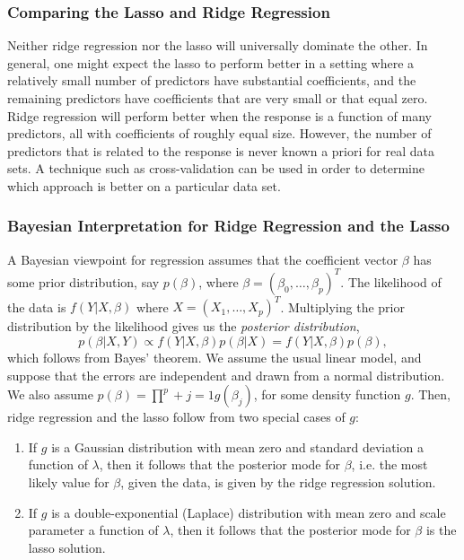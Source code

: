 \documentclass{article}
\numberwithin{equation}{section}
\begin{document}
\begin{enumerate}
\subsubsection*{Comparing the Lasso and Ridge Regression}
Neither ridge regression nor the lasso will universally dominate the other. In general, one might expect the lasso to perform better in a setting where a relatively small number of predictors have substantial coefficients, and the remaining predictors have coefficients that are very small or that equal zero. Ridge regression will perform better when the response is a function of many predictors, all with coefficients of roughly equal size. However, the number of predictors that is related to the response is never known a priori for real data sets. A technique such as cross-validation can be used in order to determine which approach is better on a particular data set.

\subsubsection*{Bayesian Interpretation for Ridge Regression and the Lasso}
A Bayesian viewpoint for regression assumes that the coefficient vector $\beta$ has some prior distribution, say $p(\beta)$, where $\beta = (\beta_0, \dots, \beta_p )^T$. The likelihood of the data is $f(Y |X, \beta)$ where $X= (X_1, \dots, X_p)^T$.  Multiplying the prior distribution by the likelihood gives us the \textit{posterior distribution},
\begin{equation}
    p(\beta|X, Y ) \propto f(Y |X, \beta) p(\beta|X) = f(Y |X, \beta)p(\beta),
\end{equation}
which follows from Bayes’ theorem. We assume the usual linear model, and suppose that the errors are independent and drawn from a normal distribution. We also assume $p(\beta) = \prod^{p}+{j=1} g(\beta_j)$, for some density function $g$. Then,  ridge regression and the lasso follow from two special cases of $g$:
\begin{enumerate}
    \item If $g$ is a Gaussian distribution with mean zero and standard deviation a function of $\lambda$, then it follows that the posterior mode for $\beta$, i.e. the most likely value for $\beta$, given the data, is given by the ridge regression solution.
    
    \item If $g$ is a double-exponential (Laplace) distribution with mean zero and scale parameter a function of $\lambda$, then it follows that the posterior mode for $\beta$ is the lasso solution.
\end{enumerate}


\end{enumerate}
\end{document}
